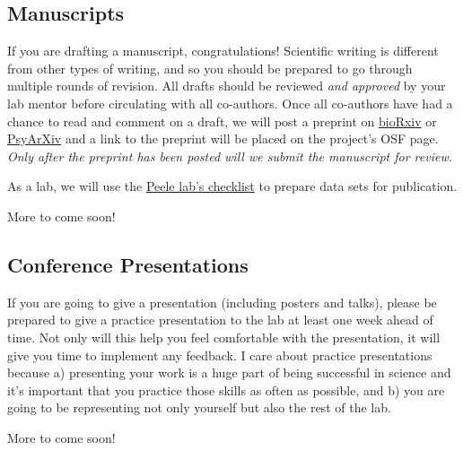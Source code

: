\documentclass[]{book}
\begin{document}
\hypertarget{manuscripts}{%
\subsection{Manuscripts}\label{manuscripts}}

If you are drafting a manuscript, congratulations! Scientific writing is different from other types of writing, and so you should be prepared to go through multiple rounds of revision. All drafts should be reviewed \emph{and approved} by your lab mentor before circulating with all co-authors. Once all co-authors have had a chance to read and comment on a draft, we will post a preprint on \href{https://www.biorxiv.org/}{bioRxiv} or \href{https://psyarxiv.com/}{PsyArXiv} and a link to the preprint will be placed on the project's OSF page. \emph{Only after the preprint has been posted will we submit the manuscript for review.}

As a lab, we will use the \href{https://github.com/jpeelle/paperchecklist/blob/master/checklist.pdf}{Peele lab's checklist} to prepare data sets for publication.

More to come soon!

\hypertarget{conference-presentations}{%
\subsection{Conference Presentations}\label{conference-presentations}}

If you are going to give a presentation (including posters and talks), please be prepared to give a practice presentation to the lab at least one week ahead of time. Not only will this help you feel comfortable with the presentation, it will give you time to implement any feedback. I care about practice presentations because a) presenting your work is a huge part of being successful in science and it's important that you practice those skills as often as possible, and b) you are going to be representing not only yourself but also the rest of the lab.

More to come soon!
\end{document}

